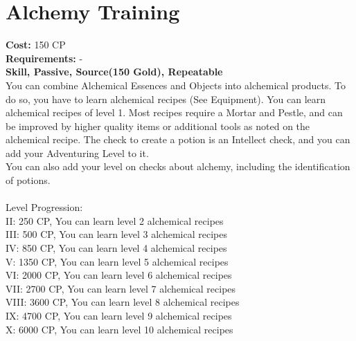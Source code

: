 \section{Alchemy Training}
\textbf{Cost:} 150 CP\\
\textbf{Requirements:} -\\
\textbf{Skill, Passive, Source(150 Gold), Repeatable}\\
You can combine Alchemical Essences and Objects into alchemical products. To do so, you have to learn alchemical recipes (See Equipment). You can learn alchemical recipes of level 1. Most recipes require a Mortar and Pestle, and can be improved by higher quality items or additional tools as noted on the alchemical recipe. The check to create a potion is an Intellect check, and you can add your Adventuring Level to it.\\
You can also add your level on checks about alchemy, including the identification of potions.\\
\\
Level Progression:\\
II: 250 CP, You can learn level 2 alchemical recipes\\
III: 500 CP, You can learn level 3 alchemical recipes\\
IV: 850 CP, You can learn level 4 alchemical recipes\\
V: 1350 CP, You can learn level 5 alchemical recipes\\
VI: 2000 CP, You can learn level 6 alchemical recipes\\
VII: 2700 CP, You can learn level 7 alchemical recipes\\
VIII: 3600 CP, You can learn level 8 alchemical recipes\\
IX: 4700 CP, You can learn level 9 alchemical recipes\\
X: 6000 CP, You can learn level 10 alchemical recipes\\